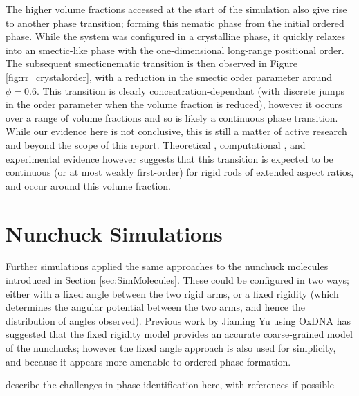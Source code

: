 \documentclass[11pt, a4paper]{article} %
\begin{document}
The higher volume fractions accessed at the start of the simulation also give rise to another phase transition; forming this nematic phase from the initial ordered phase. While the system was configured in a crystalline phase, it quickly relaxes into an smectic-like phase with the one-dimensional long-range positional order. The subsequent smectic\textendash nematic transition is then observed in Figure \ref{fig:rr_crystalorder}, with a reduction in the smectic order parameter around $\phi  = 0.6$. This transition is clearly concentration-dependant (with discrete jumps in the order parameter when the volume fraction is reduced), however it occurs over a range of volume fractions and so is likely a continuous phase transition. While our evidence here is not conclusive, this is still a matter of active research and beyond the scope of this report. Theoretical \cite{Wen1987}, computational \cite{Frenkel1988, McGrother1996}, and experimental \cite{Dogic1997, Doane1972} evidence however suggests that this transition is expected to be continuous (or at most weakly first-order) for rigid rods of extended aspect ratios, and occur around this volume fraction. 

\section{Nunchuck Simulations} \label{sec:Nunchuck_Sim}
Further simulations applied the same approaches to the nunchuck molecules introduced in Section \ref{sec:SimMolecules}. These could be configured in two ways; either with a fixed angle between the two rigid arms, or a fixed rigidity (which determines the angular potential between the two arms, and hence the distribution of angles observed). Previous work by Jiaming Yu using OxDNA \cite{OxDNA} has suggested that the fixed rigidity model provides an accurate coarse-grained model of the nunchucks; however the fixed angle approach is also used for simplicity, and because it appears more amenable to ordered phase formation.

describe the challenges in phase identification here, with references if possible

\end{document}
